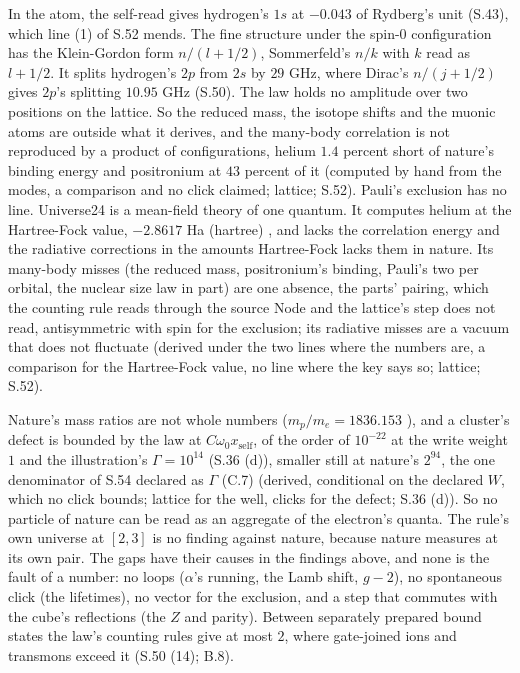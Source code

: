 \documentclass[pdflatex,sn-mathphys-num]{sn-jnl}
\theoremstyle{thmstyleone}
\begin{document}
In the atom, the self-read gives hydrogen's $1s$ at $-0.043$ of Rydberg's unit (S.43), which line (1) of S.52 mends. The fine structure under the spin-0 configuration has the Klein-Gordon form $n / (l + 1 / 2)$, Sommerfeld's $n / k$ \cite{sommerfeld} with $k$ read as $l + 1 / 2$. It splits hydrogen's $2p$ from $2s$ by $29$ GHz, where Dirac's $n / (j + 1 / 2)$ gives $2p$'s splitting $10.95$ GHz (S.50). The law holds no amplitude over two positions on the lattice. So the reduced mass, the isotope shifts and the muonic atoms are outside what it derives, and the many-body correlation is not reproduced by a product of configurations, helium $1.4$ percent short of nature's binding energy and positronium at $43$ percent of it (computed by hand from the modes, a comparison and no click claimed; lattice; S.52). Pauli's exclusion has no line. Universe24 is a mean-field theory of one quantum. It computes helium at the Hartree-Fock value, $-2.8617$ Ha (hartree) \cite{roothaan}, and lacks the correlation energy and the radiative corrections in the amounts Hartree-Fock lacks them in nature. Its many-body misses (the reduced mass, positronium's binding, Pauli's two per orbital, the nuclear size law in part) are one absence, the parts' pairing, which the counting rule reads through the source Node and the lattice's step does not read, antisymmetric with spin for the exclusion; its radiative misses are a vacuum that does not fluctuate (derived under the two lines where the numbers are, a comparison for the Hartree-Fock value, no line where the key says so; lattice; S.52).

Nature's mass ratios are not whole numbers ($m_p / m_e = 1836.153$ \cite{codata}), and a cluster's defect is bounded by the law at $C\omega_0 x_{\mathrm{self}}$, of the order of $10^{-22}$ at the write weight $1$ and the illustration's $\Gamma = 10^{14}$ (S.36 (d)), smaller still at nature's $2^{94}$, the one denominator of S.54 declared as $\Gamma$ (C.7) (derived, conditional on the declared $W$, which no click bounds; lattice for the well, clicks for the defect; S.36 (d)). So no particle of nature can be read as an aggregate of the electron's quanta. The rule's own universe at $[2, 3]$ is no finding against nature, because nature measures at its own pair. The gaps have their causes in the findings above, and none is the fault of a number: no loops ($\alpha$'s running, the Lamb shift, $g - 2$), no spontaneous click (the lifetimes), no vector for the exclusion, and a step that commutes with the cube's reflections (the $Z$ and parity). Between separately prepared bound states the law's counting rules give at most $2$, where gate-joined ions \cite{rowe} and transmons \cite{storz} exceed it (S.50 (14); B.8).
\end{document}
